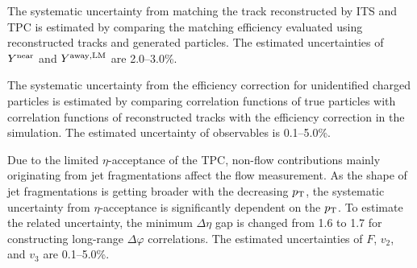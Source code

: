 The systematic uncertainty from matching the track reconstructed by ITS and TPC is estimated by comparing the matching efficiency evaluated using reconstructed tracks and generated particles. The estimated uncertainties of $Y^{\rm{near}}$ and $Y^{\rm{away,LM}}$ are 2.0--3.0\%.

The systematic uncertainty from the efficiency correction for unidentified charged particles is estimated by comparing correlation functions of true particles with correlation functions of reconstructed tracks with the efficiency correction in the simulation. The estimated uncertainty of observables is 0.1--5.0\%.

Due to the limited $\eta$-acceptance of the TPC, non-flow contributions mainly originating from jet fragmentations affect the flow measurement. As the shape of jet fragmentations is getting broader with the decreasing $p_\mathrm{T}$, the systematic uncertainty from $\eta$-acceptance is significantly dependent on the $p_{\rm{T}}$. To estimate the related uncertainty, the minimum $\Delta\eta$ gap is changed from 1.6 to 1.7 for constructing long-range $\Delta\varphi$ correlations.  The estimated uncertainties of $F$, $v_{2}$, and $v_{3}$ are 0.1--5.0\%.





